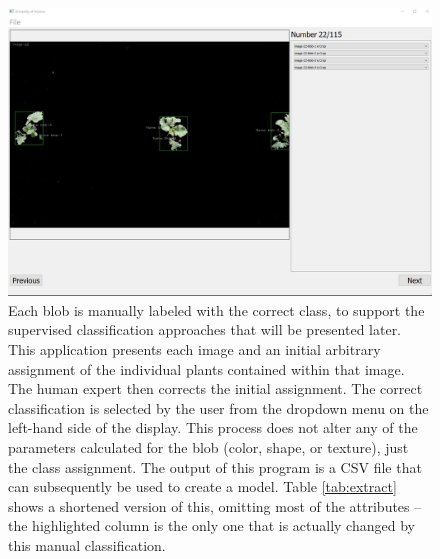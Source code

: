 \documentclass[letterpaper, notitlepage]{report}
\begin{document}
\begin{figure}[H]
	\centering
	\includegraphics[scale=0.38]{./figures/review-application.jpg}
	\caption[Manual classification application screenshot]{Each blob is manually labeled with the correct class, to support the supervised classification approaches that will  be presented later. This application presents each image and an initial arbitrary assignment of the individual plants contained within that image. The human expert then corrects the initial assignment. The correct classification is selected by the user from the dropdown menu on the left-hand side of the display. This process does not alter any of the parameters calculated for the blob (color, shape, or texture), just the class assignment. The output of this program is a CSV file that can subsequently be used to create a model. Table \ref{tab:extract} shows a shortened version of this, omitting most of the attributes -- the highlighted column is the only one that is actually changed by this manual classification.}
	\label{fig:review-application}
\end{figure}
\end{document}
